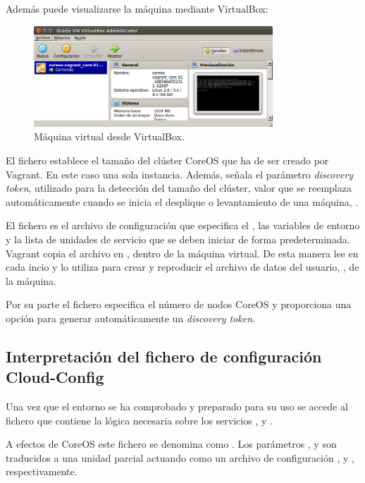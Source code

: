 Además puede visualizarse la máquina mediante VirtualBox:

\begin{figure}[H]
\centering
\includegraphics[width=0.8\textwidth]{images/figures/vboxcore01.png}
\caption{Máquina virtual  desde VirtualBox.\label{fig:figure_placement_example}}
\end{figure}

El fichero  establece el tamaño del clúster CoreOS que ha de ser creado por Vagrant. En este caso una sola instancia. Además, señala el parámetro \textit{discovery token}, utilizado para la detección del tamaño del clúster, valor que se reemplaza automáticamente cuando se inicia el desplique o levantamiento de una máquina, .

El fichero  es el archivo de configuración  que especifica el , las variables de entorno y la lista de unidades de servicio que se deben iniciar de forma predeterminada. Vagrant copia el archivo  en , dentro de la máquina virtual. De esta manera  lee  en cada incio y lo utiliza para crear y reproducir el archivo de datos del usuario, , de la máquina.

Por su parte el fichero  especifica el número de nodos CoreOS y proporciona una opción para generar automáticamente un \textit{discovery token}.

\subsection{Interpretación del fichero de configuración Cloud-Config}

Una vez que el entorno se ha comprobado y preparado para su uso se accede al fichero  que contiene la lógica necesaria sobre los servicios ,  y .

A efectos de CoreOS este fichero se denomina como . Los parámetros ,  y  son traducidos a una unidad  parcial actuando como un archivo de configuración ,  y , respectivamente. 

